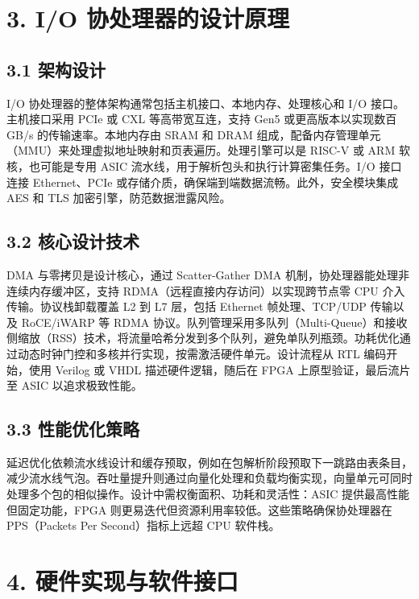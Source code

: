 \chapter{3. I/O 协处理器的设计原理}
\section{3.1 架构设计}
I/O 协处理器的整体架构通常包括主机接口、本地内存、处理核心和 I/O 接口。主机接口采用 PCIe 或 CXL 等高带宽互连，支持 Gen5 或更高版本以实现数百 GB/s 的传输速率。本地内存由 SRAM 和 DRAM 组成，配备内存管理单元（MMU）来处理虚拟地址映射和页表遍历。处理引擎可以是 RISC-V 或 ARM 软核，也可能是专用 ASIC 流水线，用于解析包头和执行计算密集任务。I/O 接口连接 Ethernet、PCIe 或存储介质，确保端到端数据流畅。此外，安全模块集成 AES 和 TLS 加密引擎，防范数据泄露风险。\par
\section{3.2 核心设计技术}
DMA 与零拷贝是设计核心，通过 Scatter-Gather DMA 机制，协处理器能处理非连续内存缓冲区，支持 RDMA（远程直接内存访问）以实现跨节点零 CPU 介入传输。协议栈卸载覆盖 L2 到 L7 层，包括 Ethernet 帧处理、TCP/UDP 传输以及 RoCE/iWARP 等 RDMA 协议。队列管理采用多队列（Multi-Queue）和接收侧缩放（RSS）技术，将流量哈希分发到多个队列，避免单队列瓶颈。功耗优化通过动态时钟门控和多核并行实现，按需激活硬件单元。设计流程从 RTL 编码开始，使用 Verilog 或 VHDL 描述硬件逻辑，随后在 FPGA 上原型验证，最后流片至 ASIC 以追求极致性能。\par
\section{3.3 性能优化策略}
延迟优化依赖流水线设计和缓存预取，例如在包解析阶段预取下一跳路由表条目，减少流水线气泡。吞吐量提升则通过向量化处理和负载均衡实现，向量单元可同时处理多个包的相似操作。设计中需权衡面积、功耗和灵活性：ASIC 提供最高性能但固定功能，FPGA 则更易迭代但资源利用率较低。这些策略确保协处理器在 PPS（Packets Per Second）指标上远超 CPU 软件栈。\par
\chapter{4. 硬件实现与软件接口}
